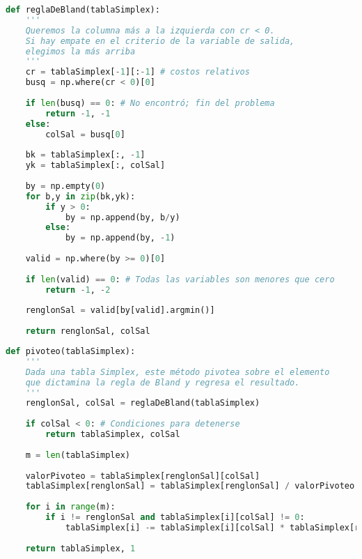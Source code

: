 \begin{lstlisting}[language=Python]
def reglaDeBland(tablaSimplex):
    '''
    Queremos la columna más a la izquierda con cr < 0.
    Si hay empate en el criterio de la variable de salida,
    elegimos la más arriba
    '''
    cr = tablaSimplex[-1][:-1] # costos relativos
    busq = np.where(cr < 0)[0]
    
    if len(busq) == 0: # No encontró; fin del problema
        return -1, -1
    else:
        colSal = busq[0]
        
    bk = tablaSimplex[:, -1]
    yk = tablaSimplex[:, colSal]
    
    by = np.empty(0)
    for b,y in zip(bk,yk):
        if y > 0:
            by = np.append(by, b/y)
        else:
            by = np.append(by, -1)
    
    valid = np.where(by >= 0)[0]
    
    if len(valid) == 0: # Todas las variables son menores que cero
        return -1, -2
    
    renglonSal = valid[by[valid].argmin()]
    
    return renglonSal, colSal
\end{lstlisting}

\begin{lstlisting}[language=Python]
def pivoteo(tablaSimplex):
    '''
    Dada una tabla Simplex, este método pivotea sobre el elemento 
    que dictamina la regla de Bland y regresa el resultado.
    '''
    renglonSal, colSal = reglaDeBland(tablaSimplex)
    
    if colSal < 0: # Condiciones para detenerse
        return tablaSimplex, colSal
    
    m = len(tablaSimplex)
    
    valorPivoteo = tablaSimplex[renglonSal][colSal]
    tablaSimplex[renglonSal] = tablaSimplex[renglonSal] / valorPivoteo
    
    for i in range(m):
        if i != renglonSal and tablaSimplex[i][colSal] != 0:
            tablaSimplex[i] -= tablaSimplex[i][colSal] * tablaSimplex[renglonSal]
    
    return tablaSimplex, 1
\end{lstlisting}

